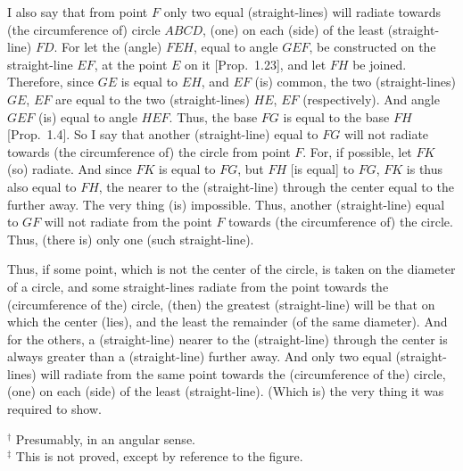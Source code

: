 \begin{Parallel}{}{}
{\epsfysize=2.5in
\centerline{}

I also say that from point $F$ only two equal (straight-lines) will radiate
towards (the circumference of) circle $ABCD$, (one) on each (side) of the
least (straight-line) $FD$. For let the (angle) $FEH$, equal to angle $GEF$, be constructed on the straight-line $EF$, at the point $E$ on it [Prop.~1.23], and
let $FH$ be joined. Therefore, since $GE$ is equal to $EH$, and $EF$ (is) common, the two (straight-lines) $GE$, $EF$ are equal to the two (straight-lines)
$HE$, $EF$ (respectively). And angle $GEF$ (is) equal to angle $HEF$. Thus, the base $FG$ is
equal to the base $FH$ [Prop.~1.4]. So I say that another (straight-line)
equal to $FG$
will not radiate towards (the circumference of)
the circle from point $F$. For, if possible, let $FK$ (so) radiate. And since
$FK$ is equal to $FG$, but $FH$ [is equal] to $FG$, $FK$ is thus also equal to
$FH$, the nearer to the (straight-line) through the center equal to the
further away. The very thing (is) impossible. Thus, another (straight-line)
equal to $GF$ will not radiate from the point $F$ towards (the circumference of) the circle.
Thus, (there is) only one (such straight-line).

Thus, if some point, which is not the
center of the circle, is taken on the diameter of a circle,
and some straight-lines radiate from the point towards
the (circumference of the) circle, (then) the greatest (straight-line) will be that on which
the center (lies), and the least the remainder (of the same diameter). And
for the others, a (straight-line) nearer to the (straight-line) through the center is always
greater than a (straight-line) further away. And only two equal (straight-lines)
will radiate from the same point towards the (circumference of the) circle,  (one)
on each (side) of the least (straight-line). (Which is) the very thing it was required to show.}
\end{Parallel}
{\footnotesize \noindent$^\dag$ Presumably, in an angular sense.\\
$^\ddag$ This is not proved, except by reference to the figure.}

